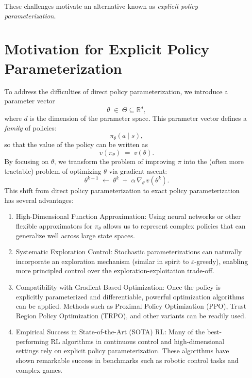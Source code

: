 These challenges motivate an alternative known as \emph{explicit policy parameterization}.

\section{Motivation for Explicit Policy Parameterization}
\label{sec:explicit_param}

To address the difficulties of direct policy parameterization, we introduce a parameter vector 
\[
  \theta \;\in\; \Theta \subseteq \mathbb{R}^d,
\]
where $d$ is the dimension of the parameter space. This parameter vector defines a \emph{family} of policies:
\[
  \pi_\theta(a \mid s),
\]
so that the value of the policy can be written as 
\[
  v(\pi_\theta) \;=\; v(\theta).
\]
By focusing on $\theta$, we transform the problem of improving $\pi$ into the (often more tractable) problem of optimizing $\theta$ via gradient ascent:
\[
  \theta^{k+1} \;\leftarrow\; \theta^k \;+\; \alpha \,\nabla_\theta \,v(\theta^k).
\]
This shift from direct policy parameterization to exact policy parameterization has several advantages:

\begin{enumerate}
  \item High-Dimensional Function Approximation: Using neural networks or other flexible approximators for $\pi_\theta$ allows us to represent complex policies that can generalize well across large state spaces.
  \item Systematic Exploration Control: Stochastic parameterizations can naturally incorporate an exploration mechanism (similar in spirit to $\varepsilon$-greedy), enabling more principled control over the exploration-exploitation trade-off.
  \item Compatibility with Gradient-Based Optimization: Once the policy is explicitly parameterized and differentiable, powerful optimization algorithms can be applied. Methods such as Proximal Policy Optimization (PPO), Trust Region Policy Optimization (TRPO), and other variants can be readily used.
  \item Empirical Success in State-of-the-Art (SOTA) RL: Many of the best-performing RL algorithms in continuous control and high-dimensional settings rely on explicit policy parameterization. These algorithms have shown remarkable success in benchmarks such as robotic control tasks and complex games.
\end{enumerate}

